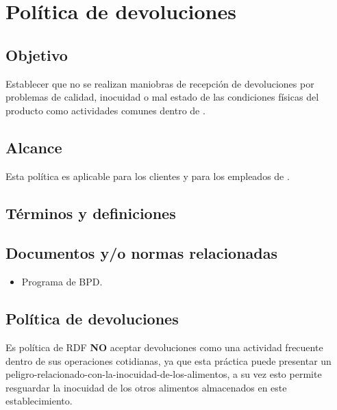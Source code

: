 \thispagestyle{formato-PI}
\renewcommand{\MayorVer}{2}
\renewcommand{\MenorVer}{1}
\renewcommand{\Codigo}{PSA-1-PROG} %
\renewcommand{\FechaPub}{2023--01}
\renewcommand{\Titulo}{Política de devoluciones}

\section{\Titulo}


\subsection{Objetivo}

Establecer que no se realizan maniobras de recepción de devoluciones por problemas de calidad, inocuidad o mal estado de las condiciones físicas del producto como actividades comunes dentro de .

\subsection{Alcance}

Esta política es aplicable para los clientes y para los empleados de .

\subsection{Términos y definiciones}

\begin{description}
\end{description}

\subsection{Documentos y/o normas relacionadas}
\begin{itemize}
	\item Programa de \gls{BPD}.
\end{itemize}

\subsection{Política de devoluciones}
Es política de \Gls{RDF} \textbf{NO} aceptar devoluciones como una actividad frecuente dentro de sus operaciones cotidianas, ya que esta práctica puede presentar un \gls{peligro-relacionado-con-la-inocuidad-de-los-alimentos}, a su vez esto permite resguardar la inocuidad de los otros \glspl{alimento} almacenados en este establecimiento.

